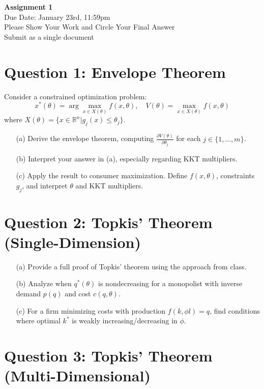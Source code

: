 \documentclass[10pt, a4paper]{article}
\newcommand{\hwnumber}{1}
\begin{document}
\begin{center}
    \Large \textbf{Assignment \hwnumber} \\
    \normalsize Due Date: January 23rd, 11:59pm \\
    Please Show Your Work and Circle Your Final Answer \\
    Submit as a single document
\end{center}

\section*{Question 1: Envelope Theorem}

Consider a constrained optimization problem:
\[
x^*(\theta) = \arg \max_{x \in X(\theta)} f(x, \theta), \quad V(\theta) = \max_{x \in X(\theta)} f(x, \theta)
\]
where $X(\theta) = \{x \in \mathbb{R}^n | g_j(x) \leq \theta_j\}$.

\begin{enumerate}
    \item[(a)] Derive the envelope theorem, computing $\frac{\partial V(\theta)}{\partial \theta_j}$ for each $j \in \{1, \ldots, m\}$.
    \item[(b)] Interpret your answer in (a), especially regarding KKT multipliers.
    \item[(c)] Apply the result to consumer maximization. Define $f(x, \theta)$, constraints $g_j$, and interpret $\theta$ and KKT multipliers.
\end{enumerate}


\section*{Question 2: Topkis' Theorem (Single-Dimension)}

\begin{enumerate}
    \item[(a)] Provide a full proof of Topkis' theorem using the approach from class.
    \item[(b)] Analyze when $q^*(\theta)$ is nondecreasing for a monopolist with inverse demand $p(q)$ and cost $c(q, \theta)$.
    \item[(c)] For a firm minimizing costs with production $f(k, \phi l) = q$, find conditions where optimal $k^*$ is weakly increasing/decreasing in $\phi$.
\end{enumerate}

\section*{Question 3: Topkis' Theorem (Multi-Dimensional)}
\end{document}
